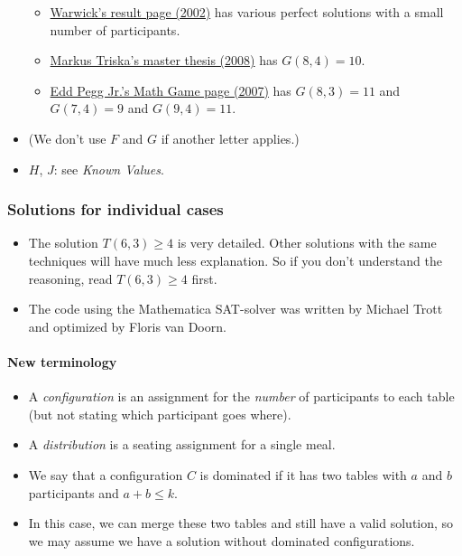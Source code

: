 \documentclass[a4paper]{article}
\begin{document}
\begin{itemize}
  \begin{itemize}

  \item
    \href{http://web.archive.org/web/20050308115423/http://www.icparc.ic.ac.uk/~wh/golf/}{Warwick's
    result page (2002)} has various perfect solutions with a small
    number of participants.
  \item
    \href{https://www.metalevel.at/sgp/}{Markus Triska's master thesis
    (2008)} has $G(8,4)=10$.
  \item
    \href{http://www.mathpuzzle.com/MAA/54-Golf\%20Tournaments/mathgames_08_14_07.html}{Edd
    Pegg Jr.'s Math Game page (2007)} has $G(8,3)=11$ and
    $G(7,4)=9$ and $G(9,4)=11$.
  \end{itemize}
\item
  (We don't use $F$ and $G$ if another letter applies.)
\item
  $H$, $J$: see \emph{Known Values}.
\end{itemize}

\subsubsection{Solutions for individual
cases}\label{solutions-for-individual-cases}

\begin{itemize}

\item
  The solution $T(6,3)\geq 4$ is very detailed. Other solutions
  with the same techniques will have much less explanation. So if you
  don't understand the reasoning, read $T(6,3)\geq 4$ first.
\item
  The code using the Mathematica SAT-solver was written by Michael Trott
  and optimized by Floris van Doorn.
\end{itemize}

\paragraph{New terminology}\label{new-terminology}

\begin{itemize}

\item
  A \emph{configuration} is an assignment for the \emph{number} of
  participants to each table (but not stating which participant goes
  where).
\item
  A \emph{distribution} is a seating assignment for a single meal.
\item
  We say that a configuration $C$ is dominated if it has two
  tables with $a$ and $b$ participants and
  $a+b\leq k$.
\item
  In this case, we can merge these two tables and still have a valid
  solution, so we may assume we have a solution without dominated
  configurations.
\end{itemize}
\end{document}
